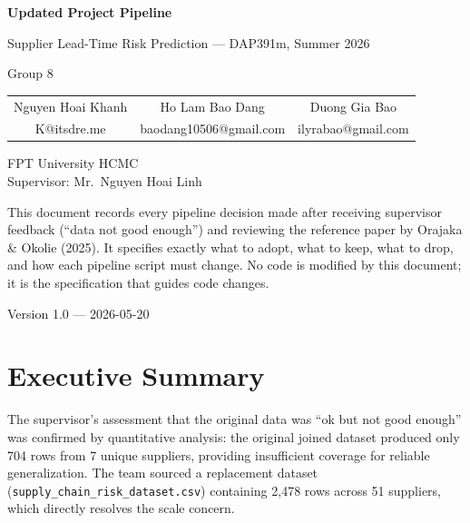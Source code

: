 \documentclass[11pt,a4paper]{article}
\begin{document}
\begin{titlepage}
\centering
\vspace*{2cm}
{\LARGE\bfseries Updated Project Pipeline\par}
\vspace{0.5em}
{\large\color{blue!70!black} Supplier Lead-Time Risk Prediction --- DAP391m, Summer 2026\par}
\vspace{0.3em}
{\normalsize Group 8\par}
\vspace{2cm}

\begin{tabular}{ccc}
  Nguyen Hoai Khanh & Ho Lam Bao Dang & Duong Gia Bao \\
  \small K@itsdre.me & \small baodang10506@gmail.com & \small ilyrabao@gmail.com
\end{tabular}

\vspace{0.8cm}
{\small FPT University HCMC \\ Supervisor: Mr.\ Nguyen Hoai Linh\par}
\vspace{1.5cm}

\begin{tcolorbox}[infobox, title={Document Purpose}]
This document records every pipeline decision made after receiving supervisor feedback
(``data not good enough'') and reviewing the reference paper by Orajaka \& Okolie (2025).
It specifies exactly what to adopt, what to keep, what to drop, and how each pipeline
script must change. No code is modified by this document; it is the specification that
guides code changes.
\end{tcolorbox}

\vfill
{\small Version 1.0 --- 2026-05-20\par}
\end{titlepage}

\tableofcontents
\newpage

\section{Executive Summary}

The supervisor's assessment that the original data was ``ok but not good enough'' was
confirmed by quantitative analysis: the original joined dataset produced only 704 rows
from 7 unique suppliers, providing insufficient coverage for reliable generalization.
The team sourced a replacement dataset (\texttt{supply\_chain\_risk\_dataset.csv})
containing 2,478 rows across 51 suppliers, which directly resolves the scale concern.
\end{document}
